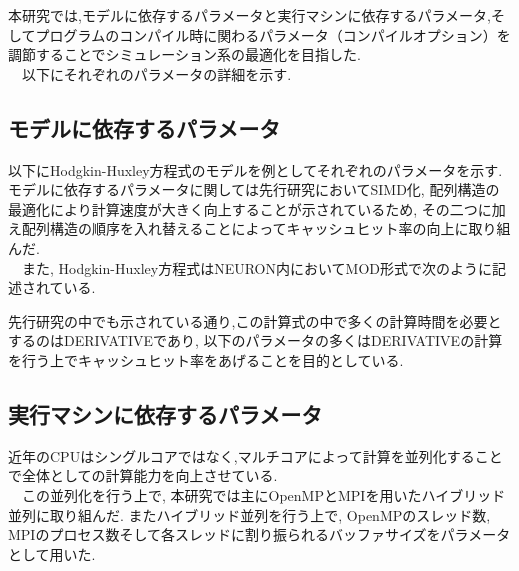 \label{sec:algorithm}
本研究では,モデルに依存するパラメータと実行マシンに依存するパラメータ,そしてプログラムのコンパイル時に関わるパラメータ（コンパイルオプション）を調節することでシミュレーション系の最適化を目指した.\\
　以下にそれぞれのパラメータの詳細を示す.\\
\subsection{モデルに依存するパラメータ}
以下にHodgkin-Huxley方程式のモデルを例としてそれぞれのパラメータを示す. モデルに依存するパラメータに関しては先行研究\cite{miyamoto-master}においてSIMD化, 配列構造の最適化により計算速度が大きく向上することが示されているため,
その二つに加え配列構造の順序を入れ替えることによってキャッシュヒット率の向上に取り組んだ.\\
　また, Hodgkin-Huxley方程式はNEURON内においてMOD形式で次のように記述されている.\\
{\scriptsize

}
先行研究\cite{miyamoto-master}の中でも示されている通り,この計算式の中で多くの計算時間を必要とするのはDERIVATIVEであり,
以下のパラメータの多くはDERIVATIVEの計算を行う上でキャッシュヒット率をあげることを目的としている.\\




\subsection{実行マシンに依存するパラメータ}
近年のCPUはシングルコアではなく,マルチコアによって計算を並列化することで全体としての計算能力を向上させている.\\
　この並列化を行う上で, 本研究では主にOpenMPとMPIを用いたハイブリッド並列に取り組んだ. またハイブリッド並列を行う上で,
OpenMPのスレッド数, MPIのプロセス数そして各スレッドに割り振られるバッファサイズをパラメータとして用いた.





